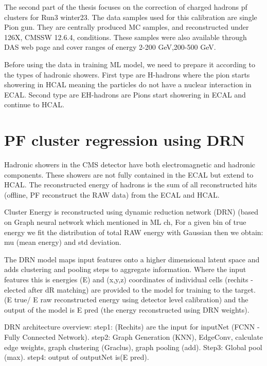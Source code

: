 The second part of the thesis focuses on the correction of charged hadrons pf clusters for Run3 winter23. The data samples used for this calibration are single Pion gun. They are centrally produced MC samples, and reconstructed under 126X, CMSSW 12.6.4, conditions. These samples were also available through DAS web page and cover ranges of energy 2-200 GeV,200-500 GeV.

Before using the data in training ML model, we need to prepare it according to the types of hadronic showers. First type are H-hadrons where the pion starts showering in HCAL meaning the particles do not have a nuclear interaction in ECAL. Second type are EH-hadrons are Pions start showering in ECAL and continue to HCAL.  

\section{PF cluster regression using DRN}

Hadronic showers in the CMS detector have both electromagnetic and hadronic components. These showers are not fully contained in the ECAL but extend to HCAL. The reconstructed energy of hadrons is the sum of all reconstructed hits (offline, PF reconstruct the RAW data) from the ECAL and HCAL. 


Cluster Energy is reconstructed using dynamic reduction network (DRN) (based on Graph neural network which mentioned in ML ch, %
For a given bin of true energy we fit the distribution of total RAW energy with Gaussian then we obtain: mu (mean energy) and std deviation.

The DRN model maps input features onto a higher dimensional latent space and adds clustering and pooling steps to aggregate information. Where the input features this is energies (E) and (x,y,z) coordinates of individual cells (rechits - elected after dR matching) are provided to the model for training to the target. (E true/ E raw reconstructed energy using detector level calibration) and the output of the model is E pred (the energy reconstructed using DRN weights).

DRN architecture overview:  
step1: (Rechits) are the input for inputNet (FCNN - Fully Connected Network). 
step2: Graph Generation (KNN), EdgeConv, calculate edge weights, graph clustering (Graclus), graph pooling (add). 
Step3: Global pool (max).  
step4: output of outputNet is(E pred).

